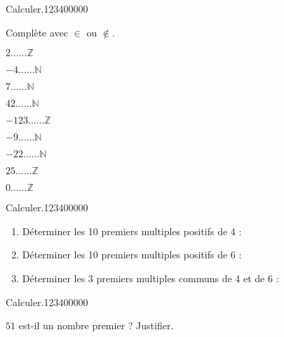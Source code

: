 \begin{pageAD} 
 


\begin{ExoCad}{Calculer.}{1234}{0}{0}{0}{0}{0}

Complète avec $\in$ ou $\not \in$.

\begin{enumerate}
\begin{minipage}{0.3\linewidth}
\item $2 \ldots \ldots \mathbb Z$
\item $-4 \ldots \ldots \mathbb N$
\item $7 \ldots \ldots \mathbb N$
\end{minipage}
\begin{minipage}{0.3\linewidth}
\item $42 \ldots \ldots \mathbb N$
\item $-123 \ldots \ldots \mathbb Z$
\item $-9 \ldots \ldots \mathbb N$
\end{minipage}
\begin{minipage}{0.3\linewidth}
\item $-22 \ldots \ldots \mathbb N$
\item $25 \ldots \ldots \mathbb Z$
\item $0 \ldots \ldots \mathbb Z$
\end{minipage}
\end{enumerate}


\end{ExoCad}


\begin{ExoCad}{Calculer.}{1234}{0}{0}{0}{0}{0}
\begin{enumerate}
\item Déterminer les 10 premiers multiples positifs de 4 : 
\item Déterminer les 10 premiers multiples positifs de 6 : 
\item Déterminer les 3 premiers multiples communs de 4 et de 6 : 
\end{enumerate}
\end{ExoCad}

\begin{ExoCad}{Calculer.}{1234}{0}{0}{0}{0}{0}

$51$ est-il un nombre premier ? Justifier. 


\end{ExoCad}
\end{pageAD}
